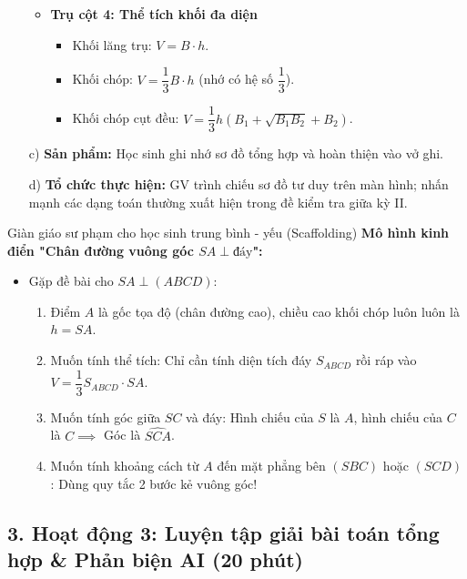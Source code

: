 \documentclass[12pt, a4paper]{article}
\begin{document}
\begin{itemize}[leftmargin=1.2cm]
\begin{itemize}[leftmargin=0.6cm]
        \item \textbf{Trụ cột 4: Thể tích khối đa diện}
        \begin{itemize}
            \item Khối lăng trụ: $V = B \cdot h$.
            \item Khối chóp: $V = \dfrac{1}{3} B \cdot h$ (nhớ có hệ số $\dfrac{1}{3}$).
            \item Khối chóp cụt đều: $V = \dfrac{1}{3} h \left( B_1 + \sqrt{B_1 B_2} + B_2 \right)$.
        \end{itemize}
    \end{itemize}

    \item[c)] \textbf{Sản phẩm:} Học sinh ghi nhớ sơ đồ tổng hợp và hoàn thiện vào vở ghi.
    \item[d)] \textbf{Tổ chức thực hiện:} GV trình chiếu sơ đồ tư duy trên màn hình; nhấn mạnh các dạng toán thường xuất hiện trong đề kiểm tra giữa kỳ II.
\end{itemize}

\begin{scaffoldbox}{Giàn giáo sư phạm cho học sinh trung bình - yếu (Scaffolding)}
    \textbf{Mô hình kinh điển "Chân đường vuông góc $SA \perp \text{đáy}$":}
    \begin{itemize}[leftmargin=0.6cm]
        \item Gặp đề bài cho $SA \perp (ABCD)$:
        \begin{enumerate}
            \item Điểm $A$ là gốc tọa độ (chân đường cao), chiều cao khối chóp luôn luôn là $h = SA$.
            \item Muốn tính thể tích: Chỉ cần tính diện tích đáy $S_{ABCD}$ rồi ráp vào $V = \dfrac{1}{3} S_{ABCD} \cdot SA$.
            \item Muốn tính góc giữa $SC$ và đáy: Hình chiếu của $S$ là $A$, hình chiếu của $C$ là $C \implies$ Góc là $\widehat{SCA}$.
            \item Muốn tính khoảng cách từ $A$ đến mặt phẳng bên $(SBC)$ hoặc $(SCD)$: Dùng quy tắc 2 bước kẻ vuông góc!
        \end{enumerate}
    \end{itemize}
\end{scaffoldbox}

\subsection*{3. Hoạt động 3: Luyện tập giải bài toán tổng hợp & Phản biện AI (20 phút)}
\end{document}

